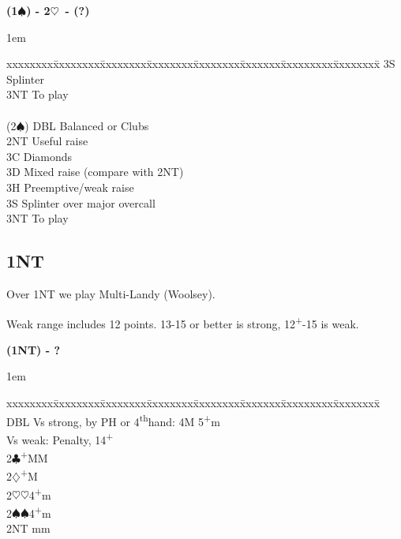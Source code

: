 \documentclass[10pt]{article}
\renewcommand{\c}{$\clubsuit$}
\renewcommand{\d}{$\diamondsuit$}
\newcommand{\h}{$\heartsuit$}
\newcommand{\s}{$\spadesuit$}
\newcommand{\p}{\textsuperscript{+}}
\newcommand{\x}{DBL}
\newcommand{\thh}{4\textsuperscript{th}}
\newenvironment{bidtable}[1][]
{\textbf{#1}
  \begin{adjustwidth}{1em}{}
    \addvspace{2pt}
    \begin{tabbing}
      xxxxxxxx\=xxxxxxxx\=xxxxxxxx\=xxxxxxxx\=xxxxxxxx\=xxxxxxx\=xxxxxxxxx\=xxxxxxxx\=\kill}
{\end{tabbing}\end{adjustwidth}\bigskip}%
\begin{document}
\begin{bidtable}[(1\s) - 2\h\ - (?)]
       \> 3S   \> Splinter                                                                         \\
       \> 3NT  \> To play                                                                          \\
                                                                                                   \\
(2\s)  \> DBL  \> Balanced or Clubs                                                                \\
       \> 2NT  \> Useful raise                                                                     \\
       \> 3C   \> Diamonds                                                                         \\
       \> 3D   \> Mixed raise (compare with 2NT)                                                   \\
       \> 3H   \> Preemptive/weak raise                                                            \\
       \> 3S   \> Splinter over major overcall                                                     \\
       \> 3NT  \> To play
\end{bidtable}



\subsection{1NT}

Over 1NT we play Multi-Landy (Woolsey).

Weak range includes 12 points. 13-15 or better is strong, 12\p-15 is weak.

\begin{bidtable}[(1NT) - ?]
\x  \> Vs strong, by PH or \thh hand: 4M 5\p m    \\
    \> Vs weak: Penalty, 14\p \\
2\c {}\p MM                \\
2\d {}\p M                  \\
2\h {}\h 4\p m              \\
2\s {}\s 4\p m              \\
2NT  mm                  \\
\end{bidtable}

\end{document}
